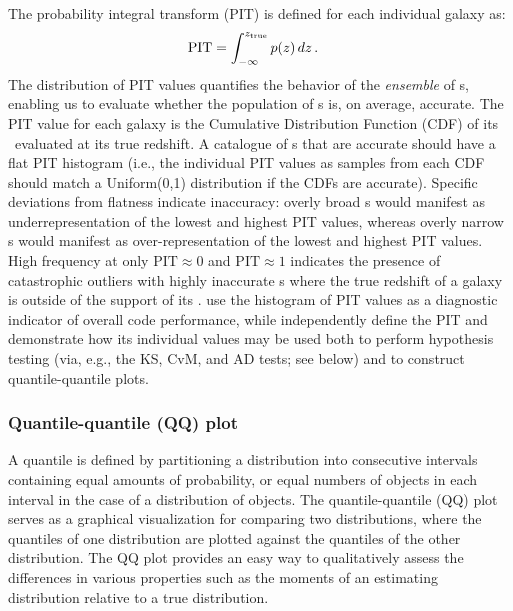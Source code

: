 The probability integral transform (PIT) \citep{Polsterer:16} is defined for each individual galaxy as:
\begin{align}
\label{eq:pit}
\mathrm{PIT} &= \int_{-\infty}^{z_{\rm true}}p(z)\, dz \,.
\end{align}
The distribution of PIT values quantifies the behavior of the {\it ensemble} of \pzpdf s, enabling us to evaluate whether the population of \pzpdf s is, on average, accurate.
The PIT value for each galaxy is the Cumulative Distribution Function (CDF) of its \pzpdf\ evaluated at its true redshift.
A catalogue of \pzpdf s that are accurate should have a flat PIT histogram (i.e., the individual PIT values as samples from each CDF should match a Uniform(0,1) distribution if the CDFs are accurate).
Specific deviations from flatness indicate inaccuracy: overly broad \pzpdf s would manifest as underrepresentation of the lowest and highest PIT values, whereas overly narrow \pzpdf s would manifest as over-representation of the lowest and highest PIT values.
High frequency at only $\mathrm{PIT}\approx0$ and $\mathrm{PIT}\approx1$ indicates the presence of catastrophic outliers with highly inaccurate \pzpdf s where the true redshift of a galaxy is outside of the support of its \pzpdf.
\citet{Tanaka:17} use the histogram of PIT values as a diagnostic indicator of overall code performance, while \citet{Freeman:17} independently define the PIT and demonstrate how its individual values may be used both to perform hypothesis testing (via, e.g., the KS, CvM, and AD tests; see below) and to construct quantile-quantile plots.

\subsubsection{Quantile-quantile (QQ) plot}
\label{sec:qq}

A quantile is defined by partitioning a distribution into consecutive intervals containing equal amounts of probability, or equal numbers of objects in each interval in the case of a distribution of objects.
The quantile-quantile (QQ) plot serves as a graphical visualization for comparing two distributions, where the quantiles of one distribution are plotted against the quantiles of the other distribution.
The QQ plot provides an easy way to qualitatively assess the differences in various properties such as the moments of an estimating distribution relative to a true distribution.

